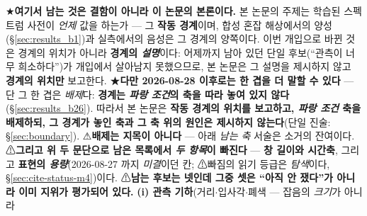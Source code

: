 \documentclass[11pt]{report}
\numberwithin{equation}{chapter}
\numberwithin{figure}{chapter}
\numberwithin{table}{chapter}
\begin{document}
★\textbf{여기서 남는 것은 결함이 아니라 이 논문의 본론이다.} 본 논문의 주제는 학습된
스펙트럼 사전이 \emph{언제} 값을 하는가 --- 그 \textbf{작동 경계}이며, 합성 혼잡 해상에서의
양성(\S\ref{sec:results_b1})과 실측에서의 음성은 그 경계의 양쪽이다. 이번 개입으로 바뀐 것은
경계의 위치가 아니라 \textbf{경계의 \emph{설명}}이다: 어제까지 남아 있던 단일 후보(``관측이
너무 희소하다'')가 개입에서 살아남지 못했으므로, 본 논문은 그 설명을 제시하지 않고
\textbf{경계의 위치만} 보고한다.
★\textbf{다만 2026-08-28 이후로는 한 겹을 더 말할 수 있다} --- 단 그 한 겹은
\emph{배제}다: \textbf{경계는 \emph{파랑 조건}의 축을 따라 놓여 있지 않다}
(\S\ref{sec:results_b26}). 따라서
본 논문은 \textbf{작동 경계의 위치를 보고하고, \emph{파랑 조건} 축을 배제하되, 그
경계가 놓인 축과 그 축 위의 원인은 제시하지 않는다}(단일 진술: \S\ref{sec:boundary}).
⚠\textbf{배제는 지목이 아니다} --- 아래 \emph{남는 축} 서술은 소거의 잔여이다.
⚠\textbf{그리고 위 두 문단으로 남은 목록에서 \emph{두 항목}이 빠진다} --- \textbf{창 길이와
시간축}, 그리고 \textbf{표현의 \emph{용량}}(2026-08-27 까지 \emph{미결}이던 칸;
⚠빠짐의 읽기 등급은 \emph{탐색}이다, \S\ref{sec:cite-status-m4})이다.
⚠\textbf{남는 후보는 넷인데 그중 셋은 ``아직 안 쟀다''가 아니라 이미 지위가 평가되어 있다.}
\textbf{(i) 관측 기하}(거리$\cdot$입사각$\cdot$폐색 --- 잡음의 \emph{크기}가 아니라
\end{document}
